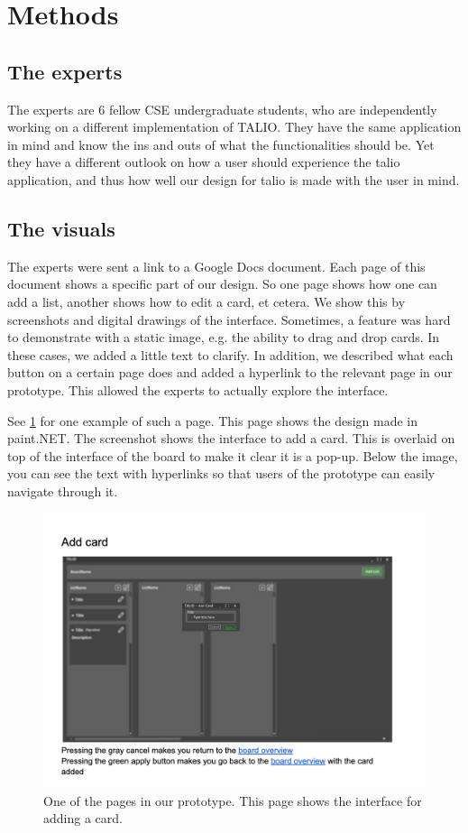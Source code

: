 \section{Methods}

\subsection{The experts}
The experts are 6 fellow CSE undergraduate students, who are independently working on a different implementation of TALIO. They have the same application in mind and know the ins and outs of what the functionalities should be. Yet they have a different outlook on how a user should experience the talio application, and thus how well our design for talio is made with the user in mind. 

\subsection{The visuals}
 The experts were sent a link to a Google Docs document. Each page of this document shows a specific part of our design. So one page shows how one can add a list, another shows how to edit a card, et cetera. We show this by screenshots and digital drawings of the interface. Sometimes, a feature was hard to demonstrate with a static image, e.g. the ability to drag and drop cards. In these cases, we added a little text to clarify. In addition, we described what each button on a certain page does and added a hyperlink to the relevant page in our prototype. This allowed the experts to actually explore the interface.

See \ref{fig:ExamplePrototypeAddCard} for one example of such a page. This page shows the design made in paint.NET. The screenshot shows the interface to add a card. This is overlaid on top of the interface of the board to make it clear it is a pop-up. Below the image, you can see the text with hyperlinks so that users of the prototype can easily navigate through it.
\begin{figure}
    \centering
    \includegraphics[width=\linewidth]{images/ExamplePrototypeAddCard.png}
    \caption{One of the pages in our prototype. This page shows the interface for adding a card.}
    \label{fig:ExamplePrototypeAddCard}
\end{figure}


